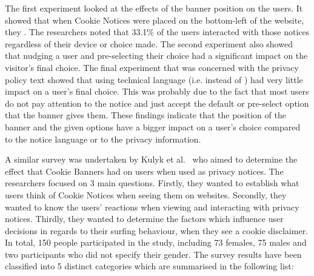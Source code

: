 \documentclass[../main.tex]{subfiles}
\begin{document}
The first experiment looked at the effects of the banner position on the users. It showed that when Cookie Notices were placed on the bottom-left of the website, they . The researchers noted that 33.1\% of the users interacted with those notices regardless of their device or choice made. The second experiment also showed that nudging a user and pre-selecting their choice had a significant impact on the visitor’s final choice. The final experiment that was concerned with the privacy policy text showed that using technical language (i.e.  instead of ) had very little impact on a user’s final choice. This was probably due to the fact that most users do not pay attention to the notice and just accept the default or pre-select option that the banner gives them. These findings indicate that the position of the banner and the given options have a bigger impact on a user’s choice compared to the notice language or to the privacy information. 

A similar survey was undertaken by Kulyk et al.~\cite{kulyk2018website} who aimed to determine the effect that Cookie Banners had on users when used as privacy notices. The researchers focused on 3 main questions. Firstly, they wanted to establish what users think of Cookie Notices when seeing them on websites. Secondly, they wanted to know the users’ reactions when viewing and interacting with privacy notices. Thirdly, they wanted to determine the factors which influence user decisions in regards to their surfing behaviour, when they see a cookie disclaimer. In total, 150 people participated in the study, including 73 females, 75 males and two participants who did not specify their gender. The survey results have been classified into 5 distinct categories which are summarised in the following list:
\end{document}
